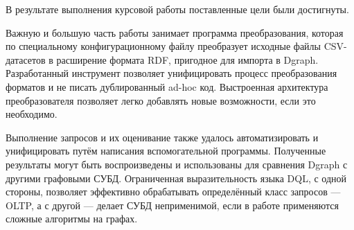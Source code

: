 
В результате выполнения курсовой работы поставленные цели были достигнуты.

Важную и большую часть работы занимает программа преобразования, которая по специальному конфигурационному файлу
преобразует исходные файлы CSV-датасетов в расширение формата RDF, пригодное для импорта в Dgraph. Разработанный
инструмент позволяет унифицировать процесс преобразования форматов и не писать дублированный ad-hoc код. Выстроенная
архитектура преобразователя позволяет легко добавлять новые возможности, если это необходимо.

Выполнение запросов и их оценивание также удалось автоматизировать и унифицировать путём написания вспомогательной
программы. Полученные результаты могут быть воспроизведены и использованы для сравнения Dgraph с другими графовыми СУБД.
Ограниченная выразительность языка DQL, с одной стороны, позволяет эффективно обрабатывать определённый класс запросов
--- OLTP, а с другой --- делает СУБД неприменимой, если в работе применяются сложные алгоритмы на графах.

